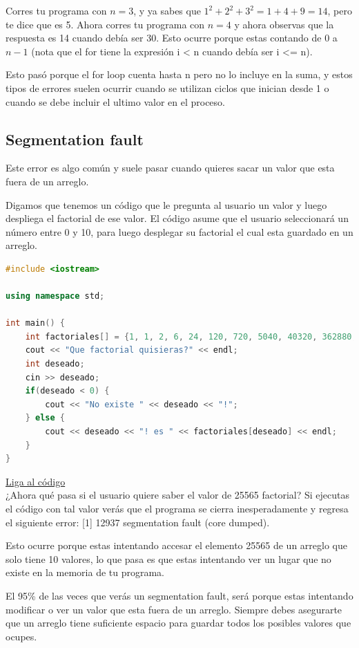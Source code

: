 \documentclass{article}
\begin{document}
Corres tu programa con $n = 3$, y ya sabes que $1^2 + 2^2 + 3^2 = 1 + 4 + 9 = 14$, pero te dice que es 5. Ahora corres tu programa con $n = 4$ y ahora observas que la respuesta es 14 cuando debía ser 30. Esto ocurre porque estas contando de $0$ a $n-1$ (nota que el for tiene la expresión i < n cuando debía ser i <= n).

Esto pasó porque el for loop cuenta hasta n pero no lo incluye en la suma, y estos tipos de errores suelen ocurrir cuando se utilizan ciclos que inician desde 1 o cuando se debe incluir el ultimo valor en el proceso.

\subsection{Segmentation fault}
Este error es algo común y suele pasar cuando quieres sacar un valor que esta fuera de un arreglo.

Digamos que tenemos un código que le pregunta al usuario un valor y luego despliega el factorial de ese valor. El código asume que el usuario seleccionará un número entre 0 y 10, para luego desplegar su factorial el cual esta guardado en un arreglo.

\begin{lstlisting}[language=C++, title=Error de segmentación]
#include <iostream>

using namespace std;

int main() {
	int factoriales[] = {1, 1, 2, 6, 24, 120, 720, 5040, 40320, 362880, 3628800};
	cout << "Que factorial quisieras?" << endl;
	int deseado;
	cin >> deseado;
	if(deseado < 0) {
		cout << "No existe " << deseado << "!";
	} else {
		cout << deseado << "! es " << factoriales[deseado] << endl;
	}
}
\end{lstlisting}
\href{https://repl.it/@Jamesscn/Indices-Inexistentes}{Liga al código}\\

¿Ahora qué pasa si el usuario quiere saber el valor de 25565 factorial? Si ejecutas el código con tal valor verás que el programa se cierra inesperadamente y regresa el siguiente error: [1] 12937 segmentation fault (core dumped).

Esto ocurre porque estas intentando accesar el elemento 25565 de un arreglo que solo tiene 10 valores, lo que pasa es que estas intentando ver un lugar que no existe en la memoria de tu programa.

El 95\% de las veces que verás un segmentation fault, será porque estas intentando modificar o ver un valor que esta fuera de un arreglo. Siempre debes asegurarte que un arreglo tiene suficiente espacio para guardar todos los posibles valores que ocupes.
\end{document}
